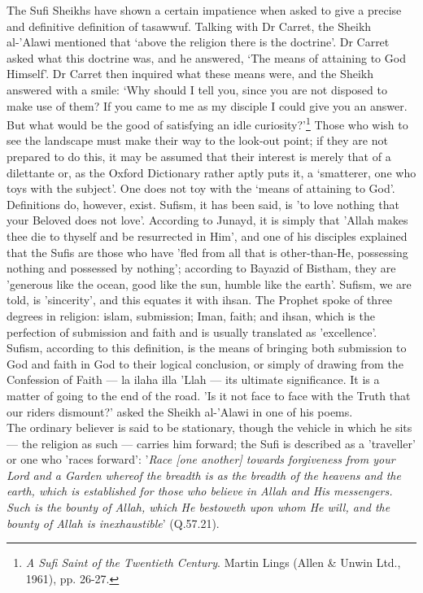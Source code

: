 \documentclass[10pt, twoside]{book}
\begin{document}
The Sufi Sheikhs have shown a certain impatience when asked to give a precise and definitive 
definition of tasawwuf. Talking with Dr Carret, the Sheikh al\hyp{}'Alawi mentioned that `above the 
religion there is the doctrine'. Dr Carret asked what this doctrine was, and he answered, `The means 
of attaining to God Himself'. Dr Carret then inquired what these means were, and the Sheikh answered 
with a smile: `Why should I tell you, since you are not disposed to make use of them? If you came to 
me as my disciple I could give you an answer. But what would be the good of satisfying an idle 									
curiosity?'\footnote{\emph{A Sufi Saint of the Twentieth Century}. Martin Lings (Allen \& Unwin Ltd., 1961), pp. 26-27.} Those who wish to see the landscape must make their way to the look\hyp{}out point; if they 
are not prepared to do this, it may be assumed that their interest is merely that of a dilettante or, 
as the Oxford Dictionary rather aptly puts it, a `smatterer, one who toys with the subject'. One does 
not toy with the `means of attaining to God'. \\

Definitions do, however, exist. Sufism, it has been said, is 'to love nothing that your Beloved does 
not love'. According to Junayd, it is simply that 'Allah makes thee die to thyself and be resurrected 
in Him', and one of his disciples explained that the Sufis are those who have 'fled from all that is 
other\hyp{}than\hyp{}He, possessing nothing and possessed by nothing'; according to Bayazid of Bistham, they 
are 'generous like the ocean, good like the sun, humble like the earth'. Sufism, we are told, is 
'sincerity', and this equates it with ihsan. The Prophet spoke of three degrees in religion: islam, 
submission; Iman, faith; and ihsan, which is the perfection of submission and faith and is usually 
translated as 'excellence'. Sufism, according to this definition, is the means of bringing both 
submission to God and faith in God to their logical conclusion, or simply of drawing from the 
Confession of Faith --- la ilaha illa 'Llah --- its ultimate significance. It is a matter of going to the 
end of the road. 'Is it not face to face with the Truth that our riders dismount?' asked the Sheikh 
al-'Alawi in one of his poems. \\

The ordinary believer is said to be stationary, though the vehicle in which he sits --- the religion as 
such --- carries him forward; the Sufi is described as a 'traveller' or one who 'races forward': '\emph{Race 
[one another] towards forgiveness from your Lord and a Garden whereof the breadth is as the breadth 
of the heavens and the earth, which is established for those who believe in Allah and His messengers. 
Such is the bounty of Allah, which He bestoweth upon whom He will, and the bounty of Allah is 
inexhaustible}' (Q.57.21). \\
\end{document}
